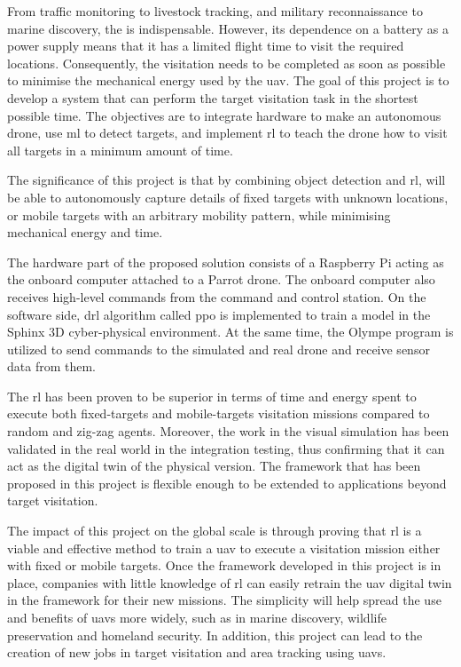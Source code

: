 \documentclass[../main.tex]{subfiles}
\begin{document}
From traffic monitoring to livestock tracking, and 
military reconnaissance to marine discovery, the \uav
is indispensable.
However, its dependence on a battery as a power supply means
that it has a limited flight time to visit the required
locations. 
Consequently, the visitation needs to be
completed as soon as possible to minimise 
the mechanical energy used by the \gls{uav}.
The goal of this project is to develop a system 
that can perform the target visitation task in the shortest
possible time. The objectives are to integrate hardware to make
an autonomous drone, use \gls{ml} 
to detect targets,
and implement \gls{rl} to 
teach the drone how to visit all targets in a minimum amount of time.

The significance of this project is that 
by combining object detection and \gls{rl}, \uavs will be
able to autonomously capture details of 
fixed targets with unknown locations, 
or mobile targets with an arbitrary mobility pattern,
while minimising mechanical energy and time.

The hardware part of the proposed solution 
consists of a Raspberry Pi acting as the onboard computer
attached to a Parrot \anafi drone. The onboard computer
also receives high-level commands from the command and control
station. On the software side, \gls{drl} algorithm called \gls{ppo} is 
implemented to train a model in the Sphinx 3D
cyber-physical environment. At the same time,
the Olympe program is utilized
to send commands to the simulated and real \anafi drone
and receive sensor data from them. 

The \gls{rl} has been proven to be superior in terms of time and
energy spent to execute both fixed-targets and mobile-targets
visitation missions compared to random and zig-zag agents.
Moreover, the work in the visual simulation has been validated in the
real world in the integration testing, thus confirming that it can act
as the digital twin of the physical version.
The framework that has been proposed in this project is flexible
enough to be extended to applications beyond target visitation.

The impact of this project on the global scale is through proving that
\gls{rl} is a viable and effective method to train a \gls{uav} to
execute a visitation mission either with fixed or mobile targets.
Once the framework developed in this project is in place, companies
with little knowledge of \gls{rl} can easily retrain the \gls{uav}
digital twin in the framework for their new missions. 
The simplicity will help spread the use and benefits of \glspl{uav}
more widely, such as in marine discovery, wildlife preservation and
homeland security. 
In addition, this project can lead to the creation of new jobs in
target visitation and area tracking using \glspl{uav}.
\end{document}
